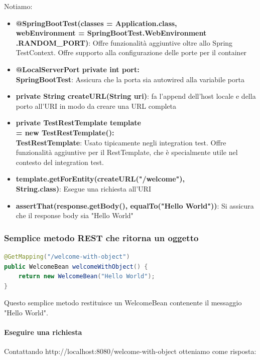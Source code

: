 \documentclass[11pt,a4paper]{book}
\begin{document}
Notiamo:
\begin{itemize}
	\item \textbf{@SpringBootTest(classes = Application.class, \\
		webEnvironment = SpringBootTest.WebEnvironment\\
		.RANDOM\_PORT)}: Offre funzionalità aggiuntive oltre allo Spring TestContext. Offre supporto alla configurazione delle porte per il container
	\item \textbf{@LocalServerPort private int port: \\
		SpringBootTest}: Assicura che la porta sia autowired alla variabile porta
	\item \textbf{private String createURL(String uri)}: fa l'append dell'host locale e della porto all'URI in modo da creare una URL completa
	\item \textbf{private TestRestTemplate template \\ 
		= new TestRestTemplate(): \\
		TestRestTemplate}: Usato tipicamente negli integration test. Offre funzionalità aggiuntive per il RestTemplate, che è specialmente utile nel contesto del integration test. 
	\item \textbf{template.getForEntity(createURL("/welcome"),\\
		String.class)}: Esegue una richiesta all'URI \\
	\item \textbf{assertThat(response.getBody(), 
		equalTo("Hello World"))}: Si assicura che il response body sia "Hello World"
\end{itemize}

\subsubsection{Semplice metodo REST che ritorna un oggetto}
\begin{lstlisting}[language = Java]
@GetMapping("/welcome-with-object")
public WelcomeBean welcomeWithObject() {
	return new WelcomeBean("Hello World");
}
\end{lstlisting}
Questo semplice metodo restituisce un WelcomeBean contenente il messaggio "Hello World".

\paragraph{Eseguire una richiesta}
Contattando http://localhost:8080/welcome-with-object otteniamo come risposta:
\end{document}
